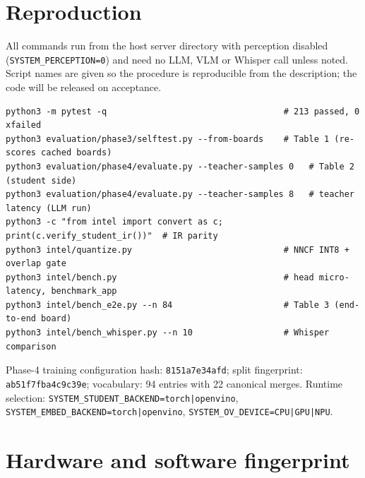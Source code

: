 \documentclass{article}
\newcommand{\fn}[1]{\texttt{#1}}
\begin{document}
\section{Reproduction}\label{app:repro}

All commands run from the host server directory with perception disabled
(\fn{SYSTEM\_PERCEPTION=0}) and need no LLM, VLM or Whisper call unless
noted. Script names are given so the
procedure is reproducible from the description; the code will be released on
acceptance.
\begin{small}
\begin{verbatim}
python3 -m pytest -q                                   # 213 passed, 0 xfailed
python3 evaluation/phase3/selftest.py --from-boards    # Table 1 (re-scores cached boards)
python3 evaluation/phase4/evaluate.py --teacher-samples 0   # Table 2 (student side)
python3 evaluation/phase4/evaluate.py --teacher-samples 8   # teacher latency (LLM run)
python3 -c "from intel import convert as c; print(c.verify_student_ir())"  # IR parity
python3 intel/quantize.py                              # NNCF INT8 + overlap gate
python3 intel/bench.py                                 # head micro-latency, benchmark_app
python3 intel/bench_e2e.py --n 84                      # Table 3 (end-to-end board)
python3 intel/bench_whisper.py --n 10                  # Whisper comparison
\end{verbatim}
\end{small}
Phase-4 training configuration hash: \fn{8151a7e34afd}; split fingerprint:
\fn{ab51f7fba4c9c39e}; vocabulary: 94 entries with 22 canonical merges.
Runtime selection: \fn{SYSTEM\_STUDENT\_BACKEND=torch|openvino},
\fn{SYSTEM\_EMBED\_BACKEND=torch|openvino}, \fn{SYSTEM\_OV\_DEVICE=CPU|GPU|NPU}.

\section{Hardware and software fingerprint}\label{app:hw}
\end{document}
